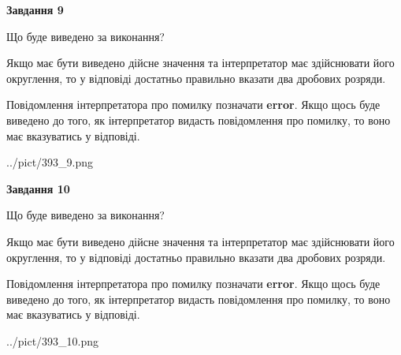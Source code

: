 \documentclass[12pt, ukrainian]{article}
\begin{document}
{\begin {Large}
{\begin {center}\textbf{Завдання 9}\end {center}}\par
Що буде виведено за виконання? \par

Якщо має бути виведено дійсне значення та інтерпретатор має здійснювати його округлення, 
то у відповіді достатньо правильно вказати два дробових розряди.

Повідомлення інтерпретатора про помилку позначати \textbf{error}.
Якщо щось буде виведено до того, як інтерпретатор видасть повідомлення про помилку, 
то воно має вказуватись у відповіді. \par

\begin{center}
	{../pict/393_9.png}
\end{center}
\newpage

{\begin {center}\textbf{Завдання 10}\end {center}}\par
Що буде виведено за виконання? \par

Якщо має бути виведено дійсне значення та інтерпретатор має здійснювати його округлення, 
то у відповіді достатньо правильно вказати два дробових розряди.

Повідомлення інтерпретатора про помилку позначати \textbf{error}.
Якщо щось буде виведено до того, як інтерпретатор видасть повідомлення про помилку, 
то воно має вказуватись у відповіді. \par

\begin{center}
	{../pict/393_10.png}
\end{center}
\newpage

\end {Large}}
\end{document}
